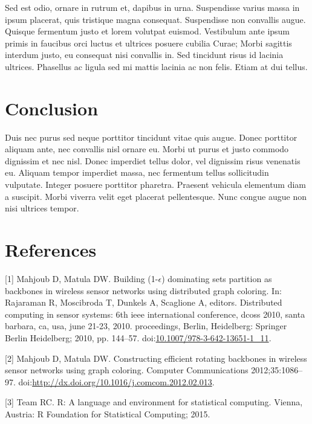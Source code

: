 \documentclass[]{elsarticle} %
\begin{document}
Sed est odio, ornare in rutrum et, dapibus in urna. Suspendisse varius
massa in ipsum placerat, quis tristique magna consequat. Suspendisse non
convallis augue. Quisque fermentum justo et lorem volutpat euismod.
Vestibulum ante ipsum primis in faucibus orci luctus et ultrices posuere
cubilia Curae; Morbi sagittis interdum justo, eu consequat nisi
convallis in. Sed tincidunt risus id lacinia ultrices. Phasellus ac
ligula sed mi mattis lacinia ac non felis. Etiam at dui tellus.

\section{Conclusion}\label{conclusion}

Duis nec purus sed neque porttitor tincidunt vitae quis augue. Donec
porttitor aliquam ante, nec convallis nisl ornare eu. Morbi ut purus et
justo commodo dignissim et nec nisl. Donec imperdiet tellus dolor, vel
dignissim risus venenatis eu. Aliquam tempor imperdiet massa, nec
fermentum tellus sollicitudin vulputate. Integer posuere porttitor
pharetra. Praesent vehicula elementum diam a suscipit. Morbi viverra
velit eget placerat pellentesque. Nunc congue augue non nisi ultrices
tempor.

\section*{References}\label{references}

\hypertarget{refs}{}
\hypertarget{ref-mahjoub2010}{}
{[}1{]} Mahjoub D, Matula DW. Building (1-\(\epsilon\)) dominating sets
partition as backbones in wireless sensor networks using distributed
graph coloring. In: Rajaraman R, Moscibroda T, Dunkels A, Scaglione A,
editors. Distributed computing in sensor systems: 6th ieee international
conference, dcoss 2010, santa barbara, ca, usa, june 21-23, 2010.
proceedings, Berlin, Heidelberg: Springer Berlin Heidelberg; 2010, pp.
144--57.
doi:\href{https://doi.org/10.1007/978-3-642-13651-1_11}{10.1007/978-3-642-13651-1\_11}.

\hypertarget{ref-mahjoub2012}{}
{[}2{]} Mahjoub D, Matula DW. Constructing efficient rotating backbones
in wireless sensor networks using graph coloring. Computer
Communications 2012;35:1086--97.
doi:\href{https://doi.org/http://dx.doi.org/10.1016/j.comcom.2012.02.013}{http://dx.doi.org/10.1016/j.comcom.2012.02.013}.

\hypertarget{ref-r2015}{}
{[}3{]} Team RC. R: A language and environment for statistical
computing. Vienna, Austria: R Foundation for Statistical Computing;
2015.
\end{document}
